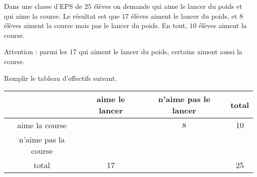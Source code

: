 
\begin{exercice}\label{exosmath-0097}

    Dans une classe d'EPS de \( 25\) élèves on demande qui aime le lancer du poids et qui aime la course. Le résultat est que \( 17\) élèves aiment le lancer du poids, et \( 8\) élèves aiment la course mais pas le lancer du poids. En tout, \( 10\) élèves aiment la course.

    Attention : parmi les \( 17\) qui aiment le lancer du poids, certains aiment aussi la course.

    Remplir le tableau d'effectifs suivant.

    \begin{center}
    \begin{tabular}[]{|c||c|c||c|}
        \hline
        &aime le lancer&n'aime pas le lancer&total\\
        \hline\hline
        aime la course&&8&10\\
        \hline
        n'aime pas la course&&&\\
        \hline
        total&17&&25\\
        \hline
    \end{tabular}
    \end{center}

\end{exercice}
